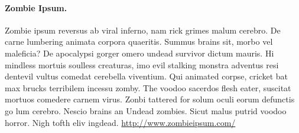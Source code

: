 \documentclass[12pt,        %
  english,ngerman,          %
  paper=a4,                 %
  captions=tablesignature,  %
  listof=numbered,          %
  bibliography=totoc,       %
  headings=small,           %
  headinclude=false,        %
  footinclude=false,        %
  parskip=half-,            %
  oneside,                  %
  DIV=12                    %
]{styles/colireport}
\begin{document}
\paragraph*{Zombie Ipsum.}  Zombie ipsum reversus ab viral inferno, nam rick grimes malum cerebro. De carne lumbering animata corpora quaeritis. Summus brains sit, morbo vel maleficia? De apocalypsi gorger omero undead survivor dictum mauris. Hi mindless mortuis soulless creaturas, imo evil stalking monstra adventus resi dentevil vultus comedat cerebella viventium. Qui animated corpse, cricket bat max brucks terribilem incessu zomby. The voodoo sacerdos flesh eater, suscitat mortuos comedere carnem virus. Zonbi tattered for solum oculi eorum defunctis go lum cerebro. Nescio brains an Undead zombies. Sicut malus putrid voodoo horror. Nigh tofth eliv ingdead.
\url{http://www.zombieipsum.com/}





\end{document}
